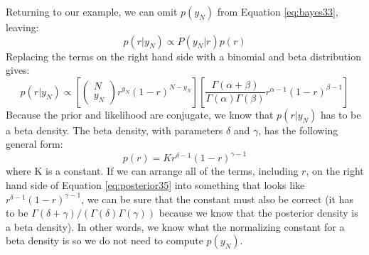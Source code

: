 Returning to our example, we can omit $p(y_N)$ from Equation \ref{eq:bayes33}, leaving:
\begin{equation*}
p(r|y_N) \propto P(y_{N}|r) p(r)
\end{equation*}
Replacing the terms on the right hand side with a binomial and beta distribution
gives:
\begin{equation}
p(r|y_N) \propto \left[
\begin{pmatrix} N \\ y_N \end{pmatrix} r^{y_N} (1 - r)^{N - y_N}
\right]
\left[
\frac{\Gamma(\alpha + \beta)}{\Gamma(\alpha)\Gamma(\beta)}
r^{\alpha - 1} (1 - r)^{\beta - 1}
\right]
\label{eq:posterior35}
\end{equation}
Because the prior and likelihood are conjugate, we know that $p(r|y_N)$ has to be a
beta density.
The beta density, with parameters $\delta$ and $\gamma$, has the following general
form:
\begin{equation*}
p(r) = K r^{\delta - 1} (1 - r)^{\gamma - 1}
\end{equation*}
where K is a constant. If we can arrange all of the terms, including $r$, on the right
hand side of Equation \eqref{eq:posterior35}
into something that looks like $r^{\delta - 1} (1 - r)^{\gamma - 1}$,
we can be
sure that the constant must also be correct (it has to be
$\Gamma(\delta + \gamma)/(\Gamma(\delta) \Gamma(\gamma))$ because
we know that the posterior density is a beta density). In other words, we know what
the normalizing constant for a beta density is so we do not need to compute $p(y_N)$.

